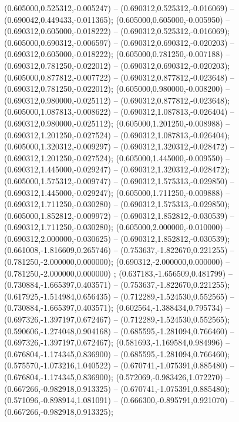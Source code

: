 (0.605000,0.525312,-0.005247) -- (0.690312,0.525312,-0.016069) -- (0.690042,0.449433,-0.011365);
 (0.605000,0.605000,-0.005950) -- (0.690312,0.605000,-0.018222) -- (0.690312,0.525312,-0.016069);
 (0.605000,0.690312,-0.006597) -- (0.690312,0.690312,-0.020203) -- (0.690312,0.605000,-0.018222);
 (0.605000,0.781250,-0.007188) -- (0.690312,0.781250,-0.022012) -- (0.690312,0.690312,-0.020203);
 (0.605000,0.877812,-0.007722) -- (0.690312,0.877812,-0.023648) -- (0.690312,0.781250,-0.022012);
 (0.605000,0.980000,-0.008200) -- (0.690312,0.980000,-0.025112) -- (0.690312,0.877812,-0.023648);
 (0.605000,1.087813,-0.008622) -- (0.690312,1.087813,-0.026404) -- (0.690312,0.980000,-0.025112);
 (0.605000,1.201250,-0.008988) -- (0.690312,1.201250,-0.027524) -- (0.690312,1.087813,-0.026404);
 (0.605000,1.320312,-0.009297) -- (0.690312,1.320312,-0.028472) -- (0.690312,1.201250,-0.027524);
 (0.605000,1.445000,-0.009550) -- (0.690312,1.445000,-0.029247) -- (0.690312,1.320312,-0.028472);
 (0.605000,1.575312,-0.009747) -- (0.690312,1.575313,-0.029850) -- (0.690312,1.445000,-0.029247);
 (0.605000,1.711250,-0.009888) -- (0.690312,1.711250,-0.030280) -- (0.690312,1.575313,-0.029850);
 (0.605000,1.852812,-0.009972) -- (0.690312,1.852812,-0.030539) -- (0.690312,1.711250,-0.030280);
 (0.605000,2.000000,-0.010000) -- (0.690312,2.000000,-0.030625) -- (0.690312,1.852812,-0.030539);
 (0.661008,-1.816609,0.265746) -- (0.753637,-1.822670,0.221255) -- (0.781250,-2.000000,0.000000);
 (0.690312,-2.000000,0.000000) -- (0.781250,-2.000000,0.000000) ;
 (0.637183,-1.656509,0.481799) -- (0.730884,-1.665397,0.403571) -- (0.753637,-1.822670,0.221255);
 (0.617925,-1.514984,0.656435) -- (0.712289,-1.524530,0.552565) -- (0.730884,-1.665397,0.403571);
 (0.602564,-1.388434,0.795734) -- (0.697326,-1.397197,0.672467) -- (0.712289,-1.524530,0.552565);
 (0.590606,-1.274048,0.904168) -- (0.685595,-1.281094,0.766460) -- (0.697326,-1.397197,0.672467);
 (0.581693,-1.169584,0.984996) -- (0.676804,-1.174345,0.836900) -- (0.685595,-1.281094,0.766460);
 (0.575570,-1.073216,1.040522) -- (0.670741,-1.075391,0.885480) -- (0.676804,-1.174345,0.836900);
 (0.572069,-0.983426,1.072270) -- (0.667266,-0.982918,0.913325) -- (0.670741,-1.075391,0.885480);
 (0.571096,-0.898914,1.081091) -- (0.666300,-0.895791,0.921070) -- (0.667266,-0.982918,0.913325);
